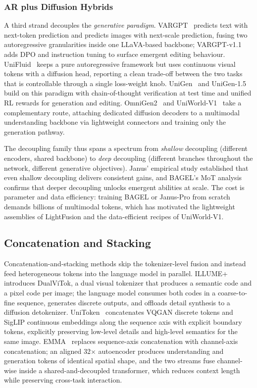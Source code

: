\subsubsection{AR plus Diffusion Hybrids}
\label{subsubsec:ar-diff}

A third strand decouples the \emph{generative paradigm}. VARGPT~\cite{Zhuang202512327} predicts text with next-token prediction and predicts images with next-scale prediction, fusing two autoregressive granularities inside one LLaVA-based backbone; VARGPT-v1.1~\cite{Zhuang202512327} adds DPO and instruction tuning to surface emergent editing behaviour. UniFluid~\cite{Fan202513436} keeps a pure autoregressive framework but uses continuous visual tokens with a diffusion head, reporting a clean trade-off between the two tasks that is controllable through a single loss-weight knob. UniGen~\cite{Tian202514682} and UniGen-1.5~\cite{Tian202514682} build on this paradigm with chain-of-thought verification at test time and unified RL rewards for generation and editing. OmniGen2~\cite{Wu202518871} and UniWorld-V1~\cite{Lin202505422} take a complementary route, attaching dedicated diffusion decoders to a multimodal understanding backbone via lightweight connectors and training only the generation pathway.

The decoupling family thus spans a spectrum from \emph{shallow} decoupling (different encoders, shared backbone) to \emph{deep} decoupling (different branches throughout the network, different generative objectives). Janus' empirical study established that even shallow decoupling delivers consistent gains, and BAGEL's MoT analysis confirms that deeper decoupling unlocks emergent abilities at scale. The cost is parameter and data efficiency: training BAGEL or Janus-Pro from scratch demands billions of multimodal tokens, which has motivated the lightweight assemblies of LightFusion and the data-efficient recipes of UniWorld-V1.

\subsection{Concatenation and Stacking}
\label{subsec:concat-stack}

Concatenation-and-stacking methods skip the tokenizer-level fusion and instead feed heterogeneous tokens into the language model in parallel. ILLUME+~\cite{Huang202506590} introduces DualViTok, a dual visual tokenizer that produces a semantic code and a pixel code per image; the language model consumes both codes in a coarse-to-fine sequence, generates discrete outputs, and offloads detail synthesis to a diffusion detokenizer. UniToken~\cite{Jiao202504423} concatenates VQGAN discrete tokens and SigLIP continuous embeddings along the sequence axis with explicit boundary tokens, explicitly preserving low-level details and high-level semantics for the same image. EMMA~\cite{He202504810} replaces sequence-axis concatenation with channel-axis concatenation; an aligned 32$\times$ autoencoder produces understanding and generation tokens of identical spatial shape, and the two streams fuse channel-wise inside a shared-and-decoupled transformer, which reduces context length while preserving cross-task interaction.

